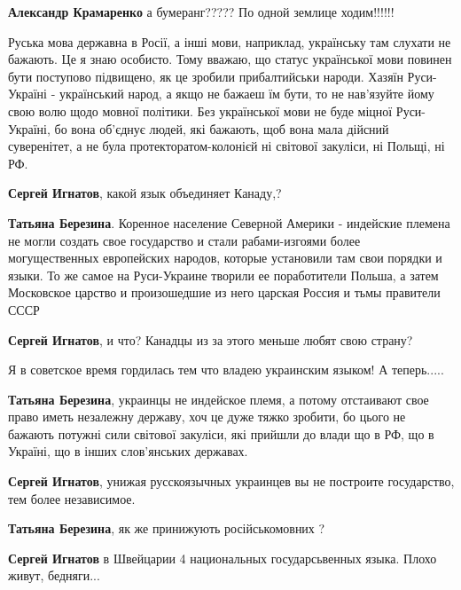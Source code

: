 \begin{itemize}
\begin{itemize}
\textbf{Александр Крамаренко} а бумеранг????? По одной землице ходим!!!!!!

\end{itemize}


Руська мова державна в Росії, а інші мови, наприклад, українську там слухати не
бажають. Це я знаю особисто. Тому вважаю, що статус української мови повинен
бути поступово підвищено, як це зробили прибалтийськи народи. Хазяїн
Руси-Україні - український народ, а якщо не бажаеш їм бути, то не нав'язуйте
йому свою волю щодо мовної політики. Без української мови не буде міцної
Руси-Україні, бо вона об'єднує людей, які бажають, щоб вона мала дійсний
суверенітет, а не була протекторатом-колонієй ні світової закуліси, ні Польщі,
ні РФ.

\begin{itemize}

\textbf{Сергей Игнатов}, какой язык объединяет Канаду,?

\textbf{Татьяна Березина}. Коренное население Северной Америки - индейские
племена не могли создать свое государство и стали рабами-изгоями более
могущественных европейских народов, которые установили там свои порядки и
языки. То же самое на Руси-Украине творили ее поработители Польша, а затем
Московское царство и произошедшие из него царская Россия и тьмы правители СССР

\textbf{Сергей Игнатов}, и что? Канадцы из за этого меньше любят свою страну?

Я в советское время гордилась тем что владею украинским языком! А теперь.....

\textbf{Татьяна Березина}, украинцы не индейское племя, а потому отстаивают
свое право иметь незалежну державу, хоч це дуже тяжко зробити, бо цього не
бажають потужні сили світової закуліси, які прийшли до влади що в РФ, що в
Україні, що в інших слов'янських державах.

\textbf{Сергей Игнатов}, унижая русскоязычных украинцев вы не построите государство, тем более независимое.

\textbf{Татьяна Березина}, як же принижують російськомовних ?

\textbf{Сергей Игнатов} в Швейцарии 4 национальных государсьвенных языка. Плохо живут, бедняги...


\end{itemize}
\end{itemize}
